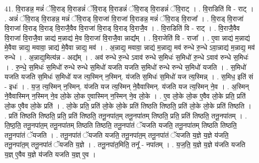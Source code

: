 \documentclass[17pt]{extarticle}
\begin{document}
41. वि॒राडन्न॒ मन्नं॑ ॅवि॒राड् वि॒राडन्नं॑ ॅवि॒राड् वि॒राडन्नं॑ ॅवि॒राड् वि॒राडन्नं॑ ॅवि॒राट् । . वि॒राडिति॑ वि - राट् । . अन्नं॑ ॅवि॒राड् वि॒राडन्न॒ मन्नं॑ ॅवि॒राड् वि॒राजा॑ वि॒राजा॑ वि॒राडन्न॒ मन्नं॑ ॅवि॒राड् वि॒राजा᳚ । . वि॒राड् वि॒राजा॑ वि॒राजा॑ वि॒राड् वि॒राड् वि॒राजै॒वैव वि॒राजा॑ वि॒राड् वि॒राड् वि॒राजै॒व । . वि॒राडिति॑ वि - राट् । . वि॒राजै॒वैव वि॒राजा॑ वि॒राजै॒वा न्नाद्य॑ म॒न्नाद्य॑ मे॒व वि॒राजा॑ वि॒राजै॒वा न्नाद्य᳚म् । . वि॒राजेति॑ वि - राजा᳚ । . ए॒वा न्नाद्य॑ म॒न्नाद्य॑ मे॒वैवा न्नाद्य॒ मवावा॒ न्नाद्य॑ मे॒वैवा न्नाद्य॒ मव॑ । . अ॒न्नाद्य॒ मवावा॒ न्नाद्य॑ म॒न्नाद्य॒ मव॑ रुन्धे रु॒न्धे ऽवा॒न्नाद्य॑ म॒न्नाद्य॒ मव॑ रुन्धे । . अ॒न्नाद्य॒मित्य॑न्न - अद्य᳚म् । . अव॑ रुन्धे रु॒न्धे ऽवाव॑ रुन्धे स॒मिधः॑ स॒मिधो॑ रु॒न्धे ऽवाव॑ रुन्धे स॒मिधः॑ । . रु॒न्धे॒ स॒मिधः॑ स॒मिधो॑ रुन्धे रुन्धे स॒मिधो॑ यजति यजति स॒मिधो॑ रुन्धे रुन्धे स॒मिधो॑ यजति । . स॒मिधो॑ यजति यजति स॒मिधः॑ स॒मिधो॑ यज त्य॒स्मिन् न॒स्मिन्. य॑जति स॒मिधः॑ स॒मिधो॑ यज त्य॒स्मिन्न् । . स॒मिध॒ इति॑ सं - इधः॑ । . य॒ज॒ त्य॒स्मिन् न॒स्मिन्. य॑जति यज त्य॒स्मिन् ने॒वैवास्मिन्. य॑जति यज त्य॒स्मिन् ने॒व । . अ॒स्मिन् ने॒वैवास्मिन् न॒स्मिन् ने॒व लो॒के लो॒क ए॒वास्मिन् न॒स्मिन् ने॒व लो॒के । . ए॒व लो॒के लो॒क ए॒वैव लो॒के प्रति॒ प्रति॑ लो॒क ए॒वैव लो॒के प्रति॑ । . लो॒के प्रति॒ प्रति॑ लो॒के लो॒के प्रति॑ तिष्ठति तिष्ठति॒ प्रति॑ लो॒के लो॒के प्रति॑ तिष्ठति । . प्रति॑ तिष्ठति तिष्ठति॒ प्रति॒ प्रति॑ तिष्ठति॒ तनू॒नपा॑त॒म् तनू॒नपा॑तम् तिष्ठति॒ प्रति॒ प्रति॑ तिष्ठति॒ तनू॒नपा॑तम् । . ति॒ष्ठ॒ति॒ तनू॒नपा॑त॒म् तनू॒नपा॑तम् तिष्ठति तिष्ठति॒ तनू॒नपा॑तं ॅयजति यजति॒ तनू॒नपा॑तम् तिष्ठति तिष्ठति॒ तनू॒नपा॑तं ॅयजति । . तनू॒नपा॑तं ॅयजति यजति॒ तनू॒नपा॑त॒म् तनू॒नपा॑तं ॅयजति य॒ज्ञे य॒ज्ञे य॑जति॒ तनू॒नपा॑त॒म् तनू॒नपा॑तं ॅयजति य॒ज्ञे । . तनू॒नपा॑त॒मिति॒ तनू᳚ - नपा॑तम् । . य॒ज॒ति॒ य॒ज्ञे य॒ज्ञे य॑जति यजति य॒ज्ञ् ए॒वैव य॒ज्ञे य॑जति यजति य॒ज्ञ् ए॒व । \newline
\pagebreak
{}
\end{document}
